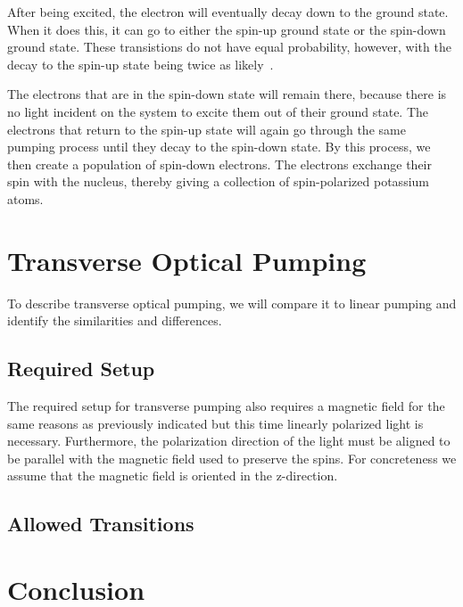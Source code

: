 \documentclass[12pt]{article}
\begin{document}
	After being excited, the electron will eventually decay
	down to the ground state. When it does this, it can go to
	either the spin-up ground state or the spin-down ground
	state. These transistions do not have equal probability,
	however, with the decay to the spin-up state being twice 
	as likely~\cite{swenson}. 

	The electrons that are in the spin-down state will remain
	there, because there is no light incident on the system to 
	excite them out of their ground state. The electrons that 
	return to the spin-up state will again go through the same 
	pumping process until they decay to the spin-down state.
	By this process, we then create a population of spin-down
	electrons. The electrons exchange their spin with 
	the nucleus, thereby giving a collection of spin-polarized
	potassium atoms. 

\section{Transverse Optical Pumping}
To describe transverse optical pumping, we will compare it to 
linear pumping and identify the similarities and differences.
	\subsection{Required Setup}
	The required setup for transverse pumping also requires
	a magnetic field for the same reasons as previously indicated
	but this time linearly polarized light is necessary.
	Furthermore, the polarization direction of the light
	must be aligned to be parallel with the magnetic field
	used to preserve the spins. For concreteness we assume
	that the magnetic field is oriented in the z-direction.

	\subsection{Allowed Transitions}


\section{Conclusion}



\end{document}
